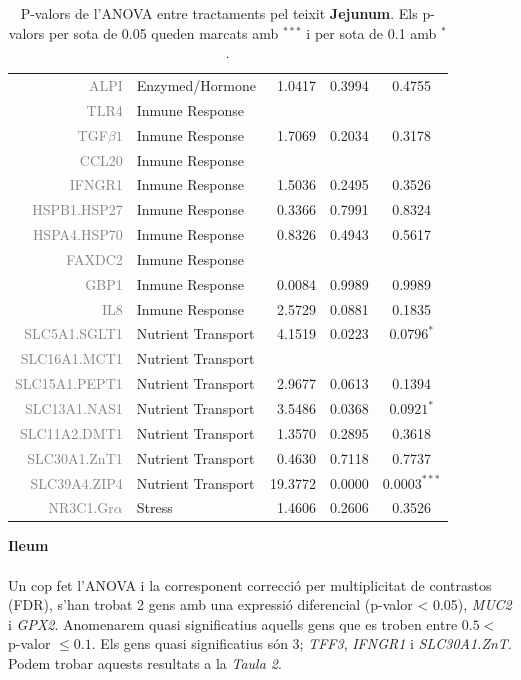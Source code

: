 \documentclass[english]{article}
\begin{document}
\begin{table}[ht]
\begin{tabular}{rlrrc}
  {\textcolor{gray}{ALPI}} & Enzymed/Hormone & 1.0417 & 0.3994 & 0.4755 \\
  {\textcolor{gray}{TLR4}} & Inmune Response &  &  &  \\
  {\textcolor{gray}{TGF$\beta1$}} & Inmune Response & 1.7069 & 0.2034 & 0.3178 \\
  {\textcolor{gray}{CCL20}} & Inmune Response &  &  &  \\
  {\textcolor{gray}{IFNGR1}} & Inmune Response & 1.5036 & 0.2495 & 0.3526 \\
  {\textcolor{gray}{HSPB1.HSP27}} & Inmune Response & 0.3366 & 0.7991 & 0.8324 \\
  {\textcolor{gray}{HSPA4.HSP70}} & Inmune Response & 0.8326 & 0.4943 & 0.5617 \\
  {\textcolor{gray}{FAXDC2}} & Inmune Response &  &  &  \\
  {\textcolor{gray}{GBP1}} & Inmune Response & 0.0084 & 0.9989 & 0.9989 \\
  {\textcolor{gray}{IL8}} & Inmune Response & 2.5729 & 0.0881 & 0.1835 \\
  {\textcolor{gray}{SLC5A1.SGLT1}} & Nutrient Transport & 4.1519 & 0.0223 & $0.0796^{*}$  \\
  {\textcolor{gray}{SLC16A1.MCT1}} & Nutrient Transport &  &  &  \\
  {\textcolor{gray}{SLC15A1.PEPT1}} & Nutrient Transport & 2.9677 & 0.0613 & 0.1394 \\
  {\textcolor{gray}{SLC13A1.NAS1}} & Nutrient Transport & 3.5486 & 0.0368 & $0.0921^{*}$  \\
  {\textcolor{gray}{SLC11A2.DMT1}} & Nutrient Transport & 1.3570 & 0.2895 & 0.3618 \\
  {\textcolor{gray}{SLC30A1.ZnT1}} & Nutrient Transport & 0.4630 & 0.7118 & 0.7737 \\
  {\textcolor{gray}{SLC39A4.ZIP4}} & Nutrient Transport & 19.3772 & 0.0000 & $0.0003^{***}$ \\
  {\textcolor{gray}{NR3C1.Gr$\alpha$}} & Stress & 1.4606 & 0.2606 & 0.3526 \\
   \bottomrule
\end{tabular}
\caption{P-valors de l'ANOVA entre tractaments pel teixit \textbf{Jejunum}. Els p-valors per sota de 0.05 queden marcats amb $^{***}$ i per sota de 0.1 amb $^{*}$.}
\end{table}
\noindent\textbf{Ileum}\\
\\
Un cop fet l'ANOVA i la corresponent correcció per multiplicitat de contrastos (FDR), s'han trobat 2 gens amb una expressió diferencial (p-valor < 0.05), \textit{MUC2} i \textit{GPX2}. Anomenarem quasi significatius aquells gens que es troben entre $0.5 <$ p-valor $\leq 0.1$. Els gens quasi significatius són 3; \textit{TFF3}, \textit{IFNGR1} i \textit{SLC30A1.ZnT}. Podem trobar aquests resultats a la \textit{Taula 2}.\\
\end{document}
